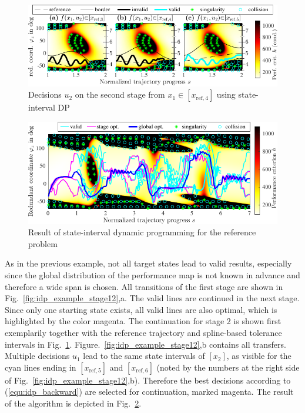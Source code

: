 \documentclass[runningheads]{llncs}
\begin{document}
\begin{figure}[ptb]
\centering
\includegraphics{dp_interv_stage2_3cases_compressed.pdf}
\caption{Decisions $u_2$ on the second stage from $x_1 \in [x_{\mathrm{ref},4}]$ using state-interval DP}
\label{fig:idp_example_stage2}
\end{figure}


\begin{figure}[ptb]
\centering
\includegraphics{dp_interv_result_compressed.pdf}
\caption{Result of state-interval dynamic programming for the reference problem}
\label{fig:idp_example_all}
\end{figure}

As in the previous example, not all target states lead to valid results, especially since the global distribution of the performance map is not known in advance and therefore a wide span is chosen.
All transitions of the first stage are shown in Fig.~\ref{fig:idp_example_stage12},a.
The valid lines are continued in the next stage.
Since only one starting state exists, all valid lines are also optimal, which is highlighted by the color magenta.
The continuation for stage 2 is shown first exemplarily together with the reference trajectory and spline-based tolerance intervals in Fig.~\ref{fig:idp_example_stage2}.
Figure.~\ref{fig:idp_example_stage12},b contains all transfers.
Multiple decisions $u_1$ lead to the same state intervals of $[x_2]$, as visible for the cyan lines ending in $[x_{\mathrm{ref},5}]$ and $[x_{\mathrm{ref},6}]$ (noted by the numbers at the right side of Fig.~\ref{fig:idp_example_stage12},b).
Therefore the best decisions according to (\ref{equ:idp_backward}) are selected for continuation, marked magenta.
The result of the algorithm is depicted in Fig.~\ref{fig:idp_example_all}.
\end{document}
